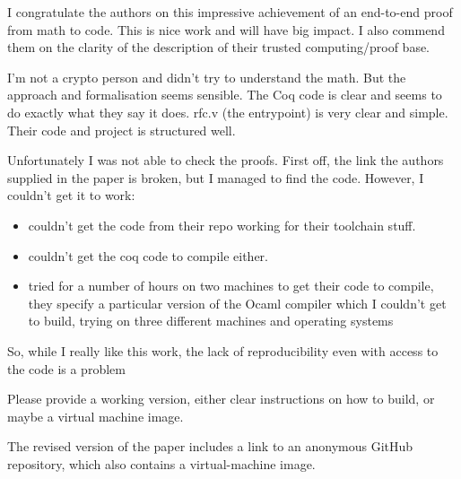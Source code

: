 \begin{center}
\end{center}

I congratulate the authors on this impressive achievement of an end-to-end proof from math to code. This is nice work and will have big impact. I also commend them on the clarity of the description of their trusted computing/proof base.

I'm not a crypto person and didn't try to understand the math. But the approach and formalisation seems sensible. The Coq code is clear and seems to do exactly what they say it does. rfc.v (the entrypoint) is very clear and simple. Their code and project is structured well.

Unfortunately I was not able to check the proofs. First off, the link the authors supplied in the paper is broken, but I managed to find the code. However, I couldn't get it to work:
\begin{itemize}
    \item couldn't get the code from their repo working for their toolchain stuff.
    \item couldn't get the coq code to compile either.
    \item tried for a number of hours on two machines to get their code to compile, they specify a particular version of the Ocaml compiler which I couldn't get to build, trying on three different machines and operating systems
\end{itemize}

So, while I really like this work, the lack of reproducibility even with access to the code is a problem

\begin{center}
\end{center}

Please provide a working version, either clear instructions on how to build, or maybe a virtual machine image.

\begin{answer}
  The revised version of the paper includes a link to an anonymous GitHub repository, 
  which also contains a virtual-machine image.
\end{answer}
